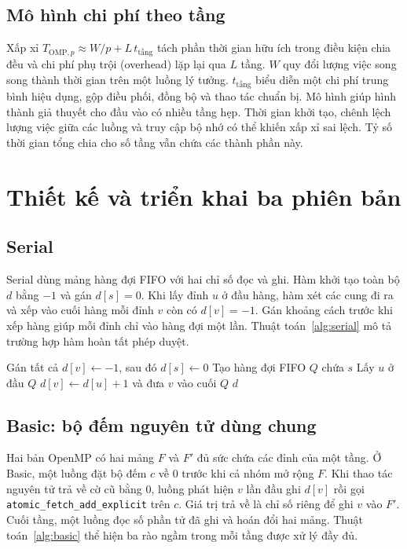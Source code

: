 \subsection{Mô hình chi phí theo tầng}
Xấp xỉ $T_{\mathrm{OMP},p}\approx W/p+L\,t_{\text{tầng}}$ tách phần thời gian hữu ích trong điều kiện chia đều và chi phí phụ trội (overhead) lặp lại qua $L$ tầng. $W$ quy đổi lượng việc song song thành thời gian trên một luồng lý tưởng. $t_{\text{tầng}}$ biểu diễn một chi phí trung bình hiệu dụng, gộp điều phối, đồng bộ và thao tác chuẩn bị. Mô hình giúp hình thành giả thuyết cho đầu vào có nhiều tầng hẹp. Thời gian khởi tạo, chênh lệch lượng việc giữa các luồng và truy cập bộ nhớ có thể khiến xấp xỉ sai lệch. Tỷ số thời gian tổng chia cho số tầng vẫn chứa các thành phần này.

\section{Thiết kế và triển khai ba phiên bản}
\label{sec:implementations}
\subsection{Serial}
Serial dùng mảng hàng đợi FIFO với hai chỉ số đọc và ghi. Hàm khởi tạo toàn bộ $d$ bằng $-1$ và gán $d[s]=0$. Khi lấy đỉnh $u$ ở đầu hàng, hàm xét các cung đi ra và xếp vào cuối hàng mỗi đỉnh $v$ còn có $d[v]=-1$. Gán khoảng cách trước khi xếp hàng giúp mỗi đỉnh chỉ vào hàng đợi một lần. Thuật toán~\ref{alg:serial} mô tả trường hợp hàm hoàn tất phép duyệt.

\begin{algorithm}[htbp]
\caption{BFS tuần tự (Serial)}
\label{alg:serial}
\begin{algorithmic}[1]
\State Gán tất cả $d[v]\gets-1$, sau đó $d[s]\gets0$
\State Tạo hàng đợi FIFO $Q$ chứa $s$
  \State Lấy $u$ ở đầu $Q$
      \State $d[v]\gets d[u]+1$ và đưa $v$ vào cuối $Q$
    \EndIf
  \EndFor
\EndWhile
\State \Return $d$
\end{algorithmic}
\end{algorithm}

\subsection{Basic: bộ đếm nguyên tử dùng chung}
Hai bản OpenMP có hai mảng $F$ và $F'$ đủ sức chứa các đỉnh của một tầng. Ở Basic, một luồng đặt bộ đếm $c$ về $0$ trước khi cả nhóm mở rộng $F$. Khi thao tác nguyên tử trả về cờ cũ bằng $0$, luồng phát hiện $v$ lần đầu ghi $d[v]$ rồi gọi \texttt{atomic\_fetch\_add\_explicit} trên $c$. Giá trị trả về là chỉ số riêng để ghi $v$ vào $F'$. Cuối tầng, một luồng đọc số phần tử đã ghi và hoán đổi hai mảng. Thuật toán~\ref{alg:basic} thể hiện ba rào ngầm trong mỗi tầng được xử lý đầy đủ.

